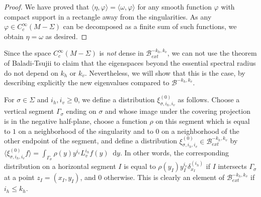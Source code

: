 \documentclass[11pt, a4paper, oneside, final, pagebackref]{amsart}
\newcommand{\boB}{\mathcal{B}}
\newcommand{\dd}{\mathop{}\!\mathrm{d}}
\renewcommand{\phi}{\varphi}
\renewcommand{\leq}{\leqslant}
\renewcommand{\geq}{\geqslant}
\theoremstyle{definition}
\numberwithin{equation}{section}
\begin{document}
\begin{proof}
We have proved that $\langle \eta, \phi \rangle = \langle \omega, \phi
\rangle$ for any smooth function $\phi$ with compact support in a rectangle
away from the singularities. As any $\phi \in C^\infty_c(M-\Sigma)$ can be
decomposed as a finite sum of such functions, we obtain $\eta = \omega$ as
desired.
\end{proof}



Since the space $C^\infty_c(M-\Sigma)$ is \emph{not} dense in
$\boB^{-k_h,k_v}_{ext}$, we can not use the theorem of Baladi-Tsujii to claim
that the eigenspaces beyond the essential spectral radius do not depend on
$k_h$ or $k_v$. Nevertheless, we will show that this is the case, by
describing explicitly the new eigenvalues compared to $\boB^{-k_h, k_v}$.

For $\sigma \in \Sigma$ and $i_h, i_v \geq 0$, we define a distribution
$\xi^{(0)}_{\sigma, i_h, i_v}$ as follows. Choose a vertical segment
$\Gamma_\sigma$ ending on $\sigma$ and whose image under the covering
projection is in the negative half-plane, choose a function $\rho$ on this
segment which is equal to $1$ on a neighborhood of the singularity and to $0$
on a neighborhood of the other endpoint of the segment, and define a
distribution $\xi^{(0)}_{\sigma, i_h, i_v} \in \boB_{ext}^{-k_h, k_v}$ by
$\langle \xi^{(0)}_{\sigma, i_h, i_v} f\rangle = \int_{\Gamma_\sigma}
\rho(y)y^{i_v} L_v^{i_h} f(y)\dd y$. In other words, the corresponding
distribution on a horizontal segment $I$ is equal to $\rho(y_I) y_I^{i_v}
\delta^{(i_h)}_{x_I}$ if $I$ intersects $\Gamma_\sigma$ at a point $z_I=(x_I,
y_I)$, and $0$ otherwise. This is clearly an element of $\boB_{ext}^{-k_h,
k_v}$ if $i_h \leq k_h$.
\end{document}
